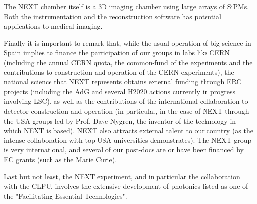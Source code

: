  The NEXT chamber itself is a 3D imaging chamber using large arrays of SiPMs. Both the instrumentation and the reconstruction software has potential applications to medical imaging. 

Finally it is important to remark that, while the usual operation of big-science in Spain implies to finance the participation of our groups in labs like CERN (including the annual CERN quota, the common-fund of the experiments and the contributions to construction and operation of the CERN experiments), the national science that NEXT represents obtains external funding through ERC projects (including the AdG and several H2020 actions currently in progress involving LSC), as well as the contributions of the international collaboration to detector construction and operation (in particular, in the case of NEXT through the USA groups led by Prof. Dave Nygren, the inventor of the technology in which NEXT is based). NEXT also attracts external talent to our country (as the intense collaboration with top USA universities demonstrates). The NEXT group is very international, and several of our post-docs are or have been financed by EC grants (such as the Marie Curie). 

Last but not least, the NEXT experiment, and in particular the collaboration with the CLPU, involves the extensive development of photonics listed as one of the  "Facilitating Essential Technologies".